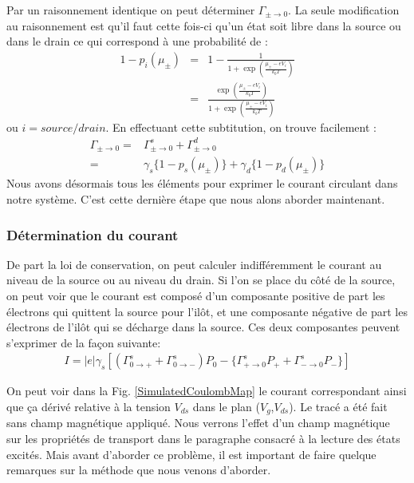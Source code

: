 Par un raisonnement identique on peut déterminer $\Gamma_{\pm \rightarrow 0}$. La seule modification au raisonnement est qu'il faut cette fois-ci qu'un état soit libre dans la source ou dans le drain ce qui correspond à une probabilité de :
\begin{eqnarray}
1 - p_i(\mu_\pm) &=& 1 - \frac{1}{1 + \exp{(\frac{\mu_\pm - eV_i}{k_bT})}} \nonumber \\
 &=& \frac{\exp{(\frac{\mu_\pm - eV_i}{k_bT})}}{1 + \exp{(\frac{\mu_\pm - eV_i}{k_bT})}}
\end{eqnarray}
ou $i=source/drain$.
En effectuant cette subtitution, on trouve facilement :
\begin{eqnarray}
\Gamma_{\pm \rightarrow 0} =& \Gamma_{\pm \rightarrow 0}^s + \Gamma_{\pm \rightarrow 0}^d  \nonumber \\
 =& \gamma_s \{1 - p_s(\mu_\pm)\} + \gamma_d \{1-p_d(\mu_\pm)\}
\end{eqnarray}
Nous avons désormais tous les éléments pour exprimer le courant circulant dans notre système. C'est cette dernière étape que nous alons aborder maintenant.
\subsubsection{Détermination du courant}
De part la loi de conservation, on peut calculer indifféremment le courant au niveau de la source ou au niveau du drain. Si l'on se place du c\^oté de la source, on peut voir que le courant est composé d'un composante positive de part les électrons qui quittent la source pour l'il\^ot, et une composante négative  de part les électrons de l'il\^ot qui se décharge dans la source. Ces deux composantes peuvent s'exprimer de la façon suivante:
\begin{eqnarray}
I = |e| \gamma_s [(\Gamma_{0 \rightarrow +}^s + \Gamma_{0 \rightarrow -}^s) P_0 - \{ \Gamma_{+ \rightarrow 0}^s P_{+} + \Gamma_{- \rightarrow 0}^s P_{-}  \}]
\end{eqnarray}


On peut voir dans la Fig. \ref{SimulatedCoulombMap} le courant correspondant ainsi que ça dérivé relative à la tension $V_{ds}$ dans le plan ($V_g$,$V_{ds}$). Le tracé a été fait sans champ magnétique appliqué. Nous verrons l'effet d'un champ magnétique sur les propriétés de transport dans le paragraphe consacré à la lecture des états excités. Mais avant d'aborder ce problème, il est important de faire quelque remarques sur la méthode que nous venons d'aborder.



